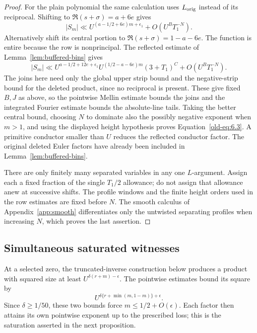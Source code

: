 \documentclass[12pt]{article}
\begin{document}
\begin{proof}
For the plain polynomial the same calculation uses
\(L_{\rm orig}\) instead of its reciprocal.  Shifting to
\(\Re(s+\sigma)=a+6e\) gives
\[
 |S_m|\ll U^{(a-1/2+6e)m+\epsilon_1}
          +O(U^B T_1^{-N}).
\]
Alternatively shift its central portion to
\(\Re(s+\sigma)=1-a-6e\).  The function is entire because the
row is nonprincipal.  The reflected estimate of
Lemma~\ref{lem:buffered-bins} gives
\[
 |S_m|\ll
 U^{a-1/2+12e+\epsilon_1}
 U^{(1/2-a-6e)m}(3+T_1)^C
 +O(U^B T_1^{-N}).
\]
The joins here need only the global upper strip bound and the
negative-strip bound for the deleted product, since no reciprocal
is present.  These give fixed \(B,J\) as above, so the pointwise
Mellin estimate bounds the joins and the integrated Fourier estimate
bounds the absolute-line tails.  Taking the better central bound,
choosing \(N\) to
dominate also the possibly negative exponent when \(m>1\), and
using the displayed height hypothesis proves
Equation~\eqref{old-eq:6.3}.  A primitive conductor smaller than
\(U\) reduces the reflected conductor factor.  The original deleted
Euler factors have already been included in
Lemma~\ref{lem:buffered-bins}.

There are only finitely many separated variables in any one
\(L\)-argument.  Assign each a fixed fraction of the single
\(T_1/2\) allowance; do not assign that allowance anew at successive
shifts.  The profile windows and the finite height orders used in the
row estimates are fixed before \(N\).  The smooth calculus of Appendix~\ref{app:smooth} differentiates only the
untwisted separating profiles when increasing \(N\), which proves
the last assertion.
\end{proof}

\subsection{Simultaneous saturated witnesses}

At a selected zero, the truncated-inverse construction below produces
a product with squared size at least $U^{\delta(r+m)-\epsilon}$.
The pointwise estimates bound its square by
\[
 U^{\delta\{r+\min(m,1-m)\}+\epsilon}.
\]
Since $\delta\ge1/50$,
these two bounds force $m\le1/2+O(\epsilon)$. Each factor then
attains its own pointwise exponent up to the prescribed loss; this
is the saturation asserted in the next proposition.
\end{document}
